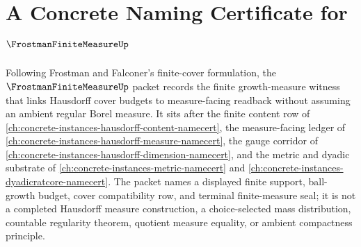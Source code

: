 \chapter{A Concrete Naming Certificate for $\FrostmanFiniteMeasureUp$}
\label{ch:concrete-instances-frostman-finite-measure-namecert}

Following Frostman and Falconer's finite-cover formulation, the $\FrostmanFiniteMeasureUp$ packet records the finite growth-measure witness that links Hausdorff cover budgets to measure-facing readback without assuming an ambient regular Borel measure. It sits after the finite content row of \autoref{ch:concrete-instances-hausdorff-content-namecert}, the measure-facing ledger of \autoref{ch:concrete-instances-hausdorff-measure-namecert}, the gauge corridor of \autoref{ch:concrete-instances-hausdorff-dimension-namecert}, and the metric and dyadic substrate of \autoref{ch:concrete-instances-metric-namecert} and \autoref{ch:concrete-instances-dyadicratcore-namecert}. The packet names a displayed finite support, ball-growth budget, cover compatibility row, and terminal finite-measure seal; it is not a completed Hausdorff measure construction, a choice-selected mass distribution, countable regularity theorem, quotient measure equality, or ambient compactness principle.

